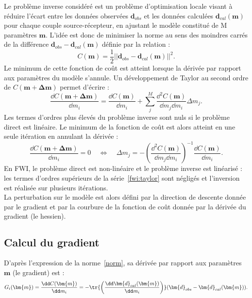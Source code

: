Le problème inverse considéré est un problème d'optimisation locale visant à réduire l'écart entre les données observées $\bm{d}_{obs}$ et les données calculées $\bm{d}_{cal}(\bm{m})$ pour chaque couple source-récepteur, en ajustant le modèle constitué de M paramètres $\bm{m}$. L'idée est donc de minimiser la norme au sens des moindres carrés de la différence $\bm{d}_{obs}-\bm{d}_{cal}(\bm{m})$ définie par la relation : 
\begin{equation}
	C(\bm{m})=\frac{1}{2}||\bm{d}_{obs}-\bm{d}_{cal}(\bm{m})||^{2}\text{.}
	\label{norm}
\end{equation}
 Le minimum de cette fonction de coût est atteint lorsque la dérivée par rapport aux paramètres du modèle s'annule. Un développement de Taylor au second ordre de $C(\bm{m}+ \bm{\Delta m})$ permet d'écrire : 
 \begin{equation}
 	\frac{\dd C(\bm{m}+\bm{\Delta m})}{\dd m_{i}}= \frac{\dd C(\bm{m})}{\dd m_{i}} + \displaystyle\sum_{j}^{M} \frac{\dd^{2} C(\bm{m})}{\dd m_{j} \dd m_{i}}\Delta m_{j}\text{.}
 	\label{fwi:taylor}
 \end{equation}
Les termes d'ordres plus élevés du problème inverse sont nuls si le problème direct est linéaire. Le minimum de la fonction de coût est alors atteint en une seule itération en annulant la dérivée : 
\begin{equation}
	\frac{\dd C(\bm{m}+\bm{\Delta m})}{\dd m_{i}} = 0 ~~~~~\Leftrightarrow ~~~~~ \Delta m _{j} = -\left( \frac{\dd ^{2} C(\bm{m})}{\dd m_{j} \dd m_{i} }\right)^{-1} \frac{\dd C (\bm{m})}{\dd m_{i}} \text{.}
\end{equation}
En FWI, le problème direct est non-linéaire et le problème inverse est linéarisé : les termes d'ordres supérieurs de la série~\ref{fwi:taylor} sont négligés et l'inversion est réalisée sur plusieurs itérations.\\
La perturbation sur le modèle est alors défini par la direction de descente donnée par le gradient et par la courbure de la fonction de coût donnée par la dérivée du gradient (le hessien).



\subsection{Calcul du gradient}

D'après l'expression de la norme~\ref{norm}, sa dérivée par rapport aux paramètres $\bm{m}$ (le gradient) est : 
\begin{equation}
	 G_{i}(\bm{m})=\frac{\dd C (\bm{m})}{\dd m_{i}} = -\tr{\left( \frac{\dd \bm{d}_{cal}(\bm{m}) }{\dd m_{i}} \right)} ( \bm{d}_{obs} - \bm{d}_{cal}(\bm{m})) \text{.}
	 \label{eq_grad}
\end{equation}\\



